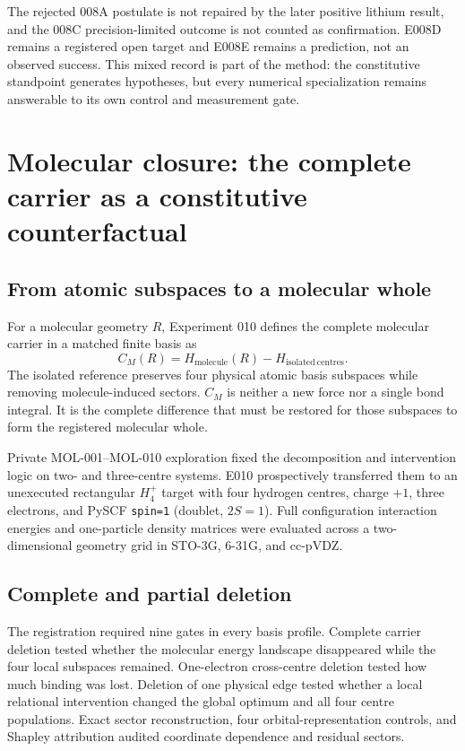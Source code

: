 \documentclass[11pt,a4paper]{article}
\begin{document}
The rejected 008A postulate is not repaired by the later positive lithium result, and the 008C precision-limited outcome is not counted as confirmation. E008D remains a registered open target and E008E remains a prediction, not an observed success. This mixed record is part of the method: the constitutive standpoint generates hypotheses, but every numerical specialization remains answerable to its own control and measurement gate.

\section{Molecular closure: the complete carrier as a constitutive counterfactual}

\subsection{From atomic subspaces to a molecular whole}

For a molecular geometry $R$, Experiment 010 defines the complete molecular carrier in a matched finite basis as
\begin{equation}
 C_M(R)=H_{\mathrm{molecule}}(R)-H_{\mathrm{isolated\ centres}}.
 \label{eq:molecular-carrier}
\end{equation}
The isolated reference preserves four physical atomic basis subspaces while removing molecule-induced sectors. $C_M$ is neither a new force nor a single bond integral. It is the complete difference that must be restored for those subspaces to form the registered molecular whole.

Private MOL-001--MOL-010 exploration fixed the decomposition and intervention logic on two- and three-centre systems. E010 prospectively transferred them to an unexecuted rectangular $H_4^+$ target with four hydrogen centres, charge $+1$, three electrons, and PySCF \texttt{spin=1} (doublet, $2S=1$). Full configuration interaction energies and one-particle density matrices were evaluated across a two-dimensional geometry grid in STO-3G, 6-31G, and cc-pVDZ.

\subsection{Complete and partial deletion}

The registration required nine gates in every basis profile. Complete carrier deletion tested whether the molecular energy landscape disappeared while the four local subspaces remained. One-electron cross-centre deletion tested how much binding was lost. Deletion of one physical edge tested whether a local relational intervention changed the global optimum and all four centre populations. Exact sector reconstruction, four orbital-representation controls, and Shapley attribution audited coordinate dependence and residual sectors.
\end{document}

